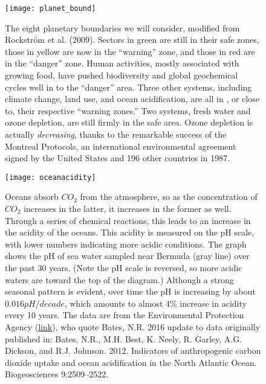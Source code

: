 \documentclass[amstex,12pt]{book}
\begin{document}
\newpage
\begin{figure}[p]
\centering
  \texttt{[image: planet\_bound]}%

\caption{The eight planetary boundaries we will consider, modified from Rockstr\"{o}m et al. (2009). Sectors in green are still in their safe zones, those in yellow are now in the ``warning'' zone, and those in red  are in the ``danger'' zone. Human activities, mostly associated with growing food, have pushed biodiversity and global geochemical cycles well in to the ``danger'' area. Three other systems, including climate change, land use, and ocean acidification, are all in , or close to, their respective ``warning zones.'' Two systems, fresh water and ozone depletion, are still firmly in the safe area. Ozone depletion is actually \emph{decreasing}, thanks to the remarkable success of the Montreal Protocols, an international environmental agreement signed by the United States and 196 other countries in 1987.}
\label{fig:planet_bound}
\end{figure}

\newpage
\begin{figure}[p]
\centering
  \texttt{[image: oceanacidity]}%


\caption{Oceans absorb $CO_2$ from the atmosphere, so as the concentration of $CO_2$ increases in the latter, it increases in the former as well. Through a series of chemical reactions, this leads to an increase in the acidity of the oceans. This acidity is measured on the pH scale, with lower numbers indicating more acidic conditions. The graph shows the pH of sea water sampled near Bermuda (gray line) over the past 30 years. (Note the pH scale is reversed, so more acidic waters are toward the top of the diagram.)  Although a strong seasonal pattern is evident, over time the pH is increasing by about $0.016 pH/decade$, which amounts to almost 4\% increase in acidity every 10 years. The data are from the Environmental Protection Agency (\href{https://www.epa.gov/climate-indicators/climate-change-indicators-ocean-acidity\#ref5}{link}), who quote Bates,  N.R. 2016 update to data originally published in: Bates, N.R., M.H. Best, K. Neely, R. Garley, A.G. Dickson, and R.J. Johnson. 2012. Indicators of anthropogenic carbon dioxide uptake and ocean acidification in the North Atlantic Ocean. Biogeosciences 9:2509–2522.}
\label{fig:ocean_acidity}
\end{figure}
\end{document}
